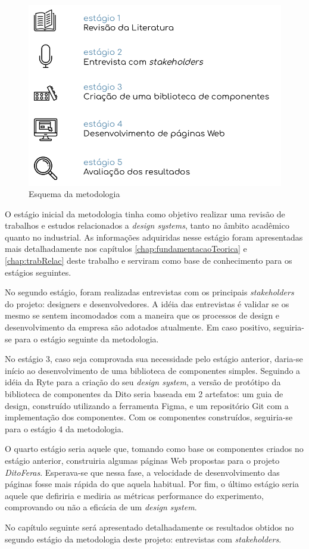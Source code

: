 \begin{figure}
	\includegraphics[width=\linewidth]{./04-figuras/04_metodologia/metodologia.png}
  \caption{Esquema da metodologia}
  \label{fig:metodology}
\end{figure}

O estágio inicial da metodologia tinha como objetivo realizar uma revisão de trabalhos e estudos relacionados a \textit{design systems}, tanto no âmbito acadêmico quanto no industrial. As informações adquiridas nesse estágio foram apresentadas mais detalhadamente nos capítulos \ref{chap:fundamentacaoTeorica} e \ref{chap:trabRelac} deste trabalho e serviram como base de conhecimento para os estágios seguintes.

No segundo estágio, foram realizadas entrevistas com os principais \textit{stakeholders} do projeto: designers e desenvolvedores. A idéia das entrevistas é validar se os mesmo se sentem incomodados com a maneira que os processos de design e desenvolvimento da empresa são adotados atualmente. Em caso positivo, seguiria-se para o estágio seguinte da metodologia.

No estágio 3, caso seja comprovada sua necessidade pelo estágio anterior, daria-se início ao desenvolvimento de uma biblioteca de componentes simples. Seguindo a idéia da Ryte \cite{ryteDesignSystem} para a criação do seu \textit{design system}, a versão de protótipo da biblioteca de componentes da Dito seria baseada em 2 artefatos: um guia de design, construído utilizando a ferramenta Figma, e um repositório Git com a implementação dos componentes. Com os componentes construídos, seguiria-se para o estágio 4 da metodologia.

O quarto estágio seria aquele que, tomando como base os componentes criados no estágio anterior, construiria algumas páginas Web propostas para o projeto \textit{DitoFeras}. Esperava-se que nessa fase, a velocidade de desenvolvimento das páginas fosse mais rápida do que aquela habitual. Por fim, o último estágio seria aquele que defiriria e mediria as métricas performance do experimento, comprovando ou não a eficácia de um \textit{design system}.

No capítulo seguinte será apresentado detalhadamente os resultados obtidos no segundo estágio da metodologia deste projeto: entrevistas com \textit{stakeholders}.
